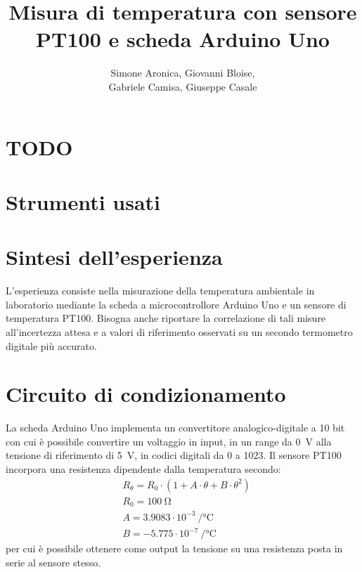 \documentclass{article}
\title{Misura di temperatura con
sensore PT100 e
scheda Arduino Uno}
\author{Simone Aronica, Giovanni Bloise, \\
Gabriele Camisa, Giuseppe Casale}
\begin{document}
\maketitle
\tableofcontents
\pagebreak

\section{TODO}
\section{Strumenti usati}

\section{Sintesi dell'esperienza}
L'esperienza consiste nella misurazione della temperatura ambientale in laboratorio mediante la scheda a microcontrollore Arduino Uno e un sensore di temperatura PT100. Bisogna anche riportare la correlazione di tali misure all'incertezza attesa e a valori di riferimento osservati su un secondo termometro digitale più accurato.

\section{Circuito di condizionamento}
La scheda Arduino Uno implementa un convertitore analogico-digitale a 10 bit con cui è possibile convertire un voltaggio in input, in un range da \SI{0}{\volt} alla tensione di riferimento di \SI{5}{\volt}, in codici digitali da 0 a 1023. 
Il sensore PT100 incorpora una resistenza dipendente dalla temperatura secondo: 
\begin{equation*}
    \begin{split}
        &R_{\theta}=R_0\cdot\left(1+A\cdot\theta+B\cdot\theta^2\right)\\
        &R_0=\SI{100}{\ohm}\\
        &A=3.9083\cdot10^{-3}\SI{}{\per\celsius}\\
        &B=-5.775\cdot10^{-7}\SI{}{\per\celsius}
    \end{split}
\end{equation*}
per cui è possibile ottenere come output la tensione su una resistenza posta in serie al sensore stesso.
\end{document}
